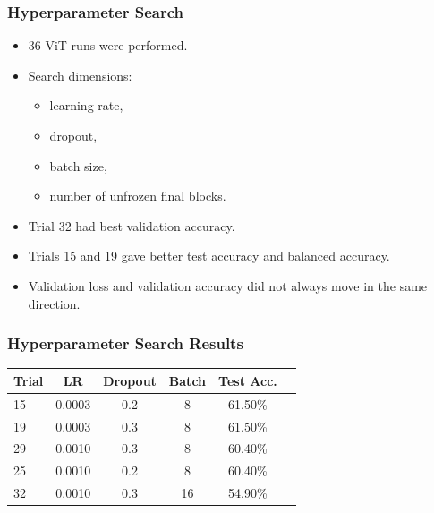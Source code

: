 \documentclass{beamer}
\begin{document}
\begin{frame}
\frametitle{Hyperparameter Search}
\begin{itemize}
\item 36 ViT runs were performed.
\item Search dimensions:
\begin{itemize}
    \item learning rate,
    \item dropout,
    \item batch size,
    \item number of unfrozen final blocks.
\end{itemize}
\item Trial 32 had best validation accuracy.
\item Trials 15 and 19 gave better test accuracy and balanced accuracy.
\item Validation loss and validation accuracy did not always move in the same direction.
\end{itemize}
\end{frame}

\begin{frame}
\frametitle{Hyperparameter Search Results}
\begin{center}
\begin{tabular}{lccccc}
\toprule
\textbf{Trial} & \textbf{LR} & \textbf{Dropout} & \textbf{Batch} & \textbf{Test Acc.} \\
\midrule
15 & 0.0003 & 0.2 & 8 & 61.50\% \\
19 & 0.0003 & 0.3 & 8 & 61.50\% \\
29 & 0.0010 & 0.3 & 8 & 60.40\% \\
25 & 0.0010 & 0.2 & 8 & 60.40\% \\
32 & 0.0010 & 0.3 & 16 & 54.90\% \\
\bottomrule
\end{tabular}
\end{center}
\end{frame}
\end{document}
